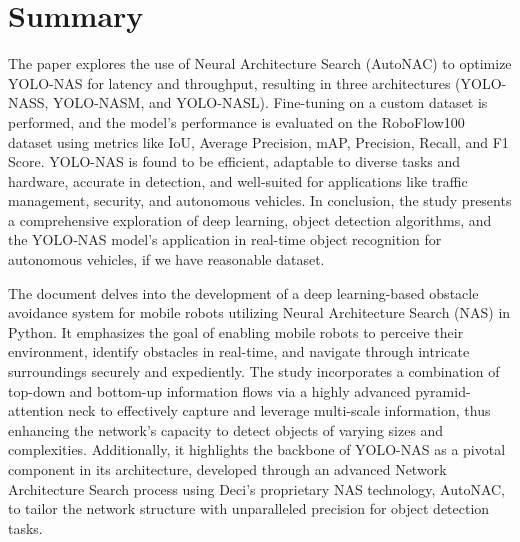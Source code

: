 \section{Summary}
The paper explores the use of Neural Architecture Search (AutoNAC) to optimize YOLO-NAS for latency and throughput, resulting in three architectures (YOLO-NASS, YOLO-NASM, and YOLO-NASL). Fine-tuning on a custom dataset is performed, and the model's performance is evaluated on the RoboFlow100 dataset using metrics like IoU, Average Precision, mAP, Precision, Recall, and F1 Score. YOLO-NAS is found to be efficient, adaptable to diverse tasks and hardware, accurate in detection, and well-suited for applications like traffic management, security, and autonomous vehicles.
In conclusion, the study presents a comprehensive exploration of deep learning, object detection algorithms, and the YOLO-NAS model's application in real-time object recognition for autonomous vehicles, if we have reasonable dataset.


The document delves into the development of a deep learning-based obstacle avoidance system for mobile robots utilizing Neural Architecture Search (NAS) in Python. It emphasizes the goal of enabling mobile robots to perceive their environment, identify obstacles in real-time, and navigate through intricate surroundings securely and expediently. The study incorporates a combination of top-down and bottom-up information flows via a highly advanced pyramid-attention neck to effectively capture and leverage multi-scale information, thus enhancing the network's capacity to detect objects of varying sizes and complexities. Additionally, it highlights the backbone of YOLO-NAS as a pivotal component in its architecture, developed through an advanced Network Architecture Search process using Deci's proprietary NAS technology, AutoNAC, to tailor the network structure with unparalleled precision for object detection tasks. 